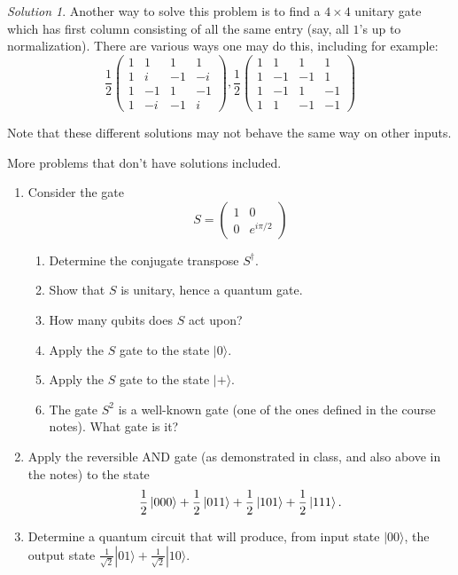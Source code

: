 \documentclass{article}
\theoremstyle{plain}
\theoremstyle{definition}
\theoremstyle{remark}
\newtheorem*{solution}{Solution}
\numberwithin{theorem}{section}
\begin{document}
\begin{enumerate}
\begin{solution}
					Another way to solve this problem is to find a $4 \times 4$ unitary gate which has first column consisting of all the same entry (say, all $1$'s up to normalization).   There are various ways one may do this, including for example:
					\[
						\frac{1}{2}
						\begin{pmatrix}
							1 & 1 & 1 & 1 \\
							1 & i & -1 & -i \\
							1 & -1 & 1 & -1 \\
							1 & -i & -1 & i
						\end{pmatrix},
						\frac{1}{2}
						\begin{pmatrix}
							1 & 1 & 1 & 1 \\
							1 & -1 & -1 & 1 \\
							1 & -1 & 1 & -1 \\
							1 & 1 & -1 & -1
						\end{pmatrix}
					\]

					Note that these different solutions may not behave the same way on other inputs.
					\end{solution}


\end{enumerate}

More problems that don't have solutions included.

\begin{enumerate}
\item Consider the gate 
\[
S = \begin{pmatrix}
    1 & 0 \\ 0 & e^{i\pi/2}
\end{pmatrix}
\]
\begin{enumerate}
    \item Determine the conjugate transpose $S^\dagger$.
    \item Show that $S$ is unitary, hence a quantum gate.
    \item How many qubits does $S$ act upon?
    \item Apply the $S$ gate to the state $|0\rangle$.
    \item Apply the $S$ gate to the state $|+\rangle$.
    \item The gate $S^2$ is a well-known gate (one of the ones defined in the course notes).  What gate is it?
\end{enumerate}
\item Apply the reversible AND gate (as demonstrated in class, and also above in the notes) to the state
\[
			\frac{1}{2} \ket{000} + \frac{1}{2} \ket{011} + \frac{1}{2} \ket{101} + \frac{1}{2} \ket{111}.
			\]
    \item Determine a quantum circuit that will produce, from input state $|00\rangle$, the output state $\frac{1}{\sqrt{2}}|01\rangle + \frac{1}{\sqrt{2}}|10 \rangle$.
\end{enumerate}
\end{document}
